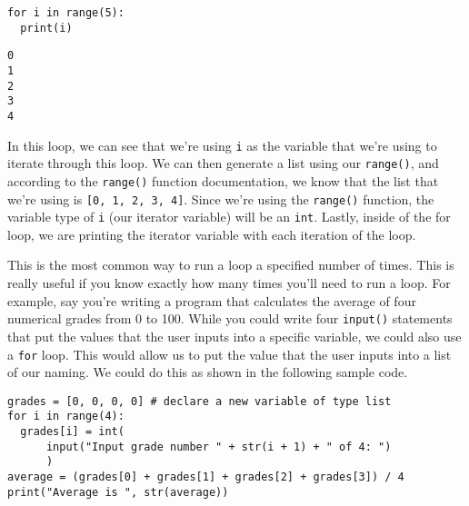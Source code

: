 \begin{lstlisting}[style=pippython]
for i in range(5):
  print(i)
\end{lstlisting}
\begin{lstlisting}
0
1
2
3
4
\end{lstlisting}
In this loop, we can see that we're using \verb|i| as the variable that we're using to iterate through this loop. We can then generate a list using our \verb|range()|, and according to the \verb|range()| function documentation, we know that the list that we're using is \verb|[0, 1, 2, 3, 4]|. Since we're using the \verb|range()| function, the variable type of \verb|i| (our iterator variable) will be an \verb|int|. Lastly, inside of the for loop, we are printing the iterator variable with each iteration of the loop.\par
This is the most common way to run a loop a specified number of times. This is really useful if you know exactly how many times you'll need to run a loop. For example, say you're writing a program that calculates the average of four numerical grades from 0 to 100. While you could write four \verb|input()| statements that put the values that the user inputs into a specific variable, we could also use a \verb|for| loop. This would allow us to put the value that the user inputs into a list of our naming. We could do this as shown in the following sample code.\par
\begin{lstlisting}[style=pippython]
grades = [0, 0, 0, 0] # declare a new variable of type list
for i in range(4):
  grades[i] = int(
      input("Input grade number " + str(i + 1) + " of 4: ")
      )
average = (grades[0] + grades[1] + grades[2] + grades[3]) / 4
print("Average is ", str(average))
\end{lstlisting}
